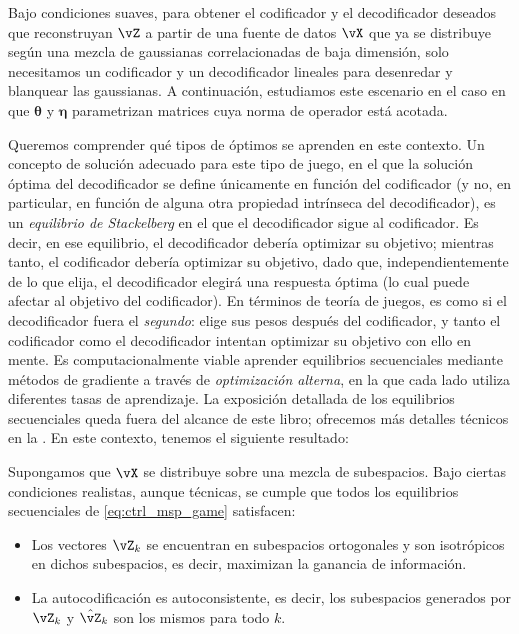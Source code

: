 \documentclass[../../book-main_es.tex]{subfiles}
\begin{document}
Bajo condiciones suaves, para obtener el codificador y el
decodificador deseados que reconstruyan \(\vZ\) a partir de una fuente de datos \(\vX\) que
ya se distribuye según una mezcla de gaussianas correlacionadas
de baja dimensión, solo necesitamos un codificador y un
decodificador lineales para desenredar y blanquear las gaussianas. A continuación, estudiamos este
escenario en el caso en que \(\bm \theta\) y \(\bm \eta\)
parametrizan matrices cuya norma de operador está acotada.

Queremos comprender qué tipos de óptimos se aprenden en este
contexto. Un concepto de solución adecuado para este tipo de juego, en el que
la solución óptima del decodificador se define únicamente en función del
codificador (y no, en particular, en función de alguna otra propiedad intrínseca
del decodificador), es un \textit{equilibrio de Stackelberg} en el que
el decodificador sigue al codificador. %
Es decir, en ese equilibrio, el decodificador debería optimizar su
objetivo; mientras tanto, el codificador debería optimizar su objetivo, dado
que, independientemente de lo que elija, el decodificador elegirá una respuesta óptima
(lo cual puede afectar al objetivo del codificador). En términos de teoría de juegos, es
como si el decodificador fuera el \textit{segundo}: elige sus pesos
después del codificador, y tanto el codificador como el decodificador intentan
optimizar su objetivo con ello en mente. Es computacionalmente
viable aprender equilibrios secuenciales mediante métodos de gradiente a través de
\textit{optimización alterna}, en la que cada lado utiliza diferentes
tasas de aprendizaje. La exposición detallada de los equilibrios secuenciales
queda fuera del alcance de este libro; ofrecemos más detalles técnicos
en la . En este contexto, tenemos el siguiente resultado:
\begin{theorem}\label{thm:ctrl_theory}
    Supongamos que \(\vX\) se distribuye sobre una mezcla de subespacios.
    Bajo ciertas condiciones realistas, aunque técnicas, se cumple que
    todos los equilibrios secuenciales de \eqref{eq:ctrl_msp_game} satisfacen:
    \begin{itemize}
        \item Los vectores \(\vZ_{k}\) se encuentran en subespacios ortogonales y son
            isotrópicos en dichos subespacios, es decir, maximizan la ganancia de información.
        \item La autocodificación es autoconsistente, es decir, los
            subespacios generados por \(\vZ_{k}\) y \(\hat{\vZ}_{k}\)
            son los mismos para todo \(k\).
    \end{itemize}
\end{theorem}
\end{document}
